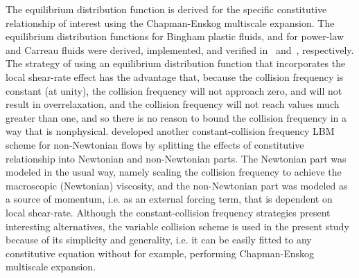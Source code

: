 \documentclass[pdftex,ms]{pittetd}
\begin{document}
The equilibrium distribution function is derived for the specific constitutive relationship of interest using the Chapman-Enskog multiscale expansion.
The equilibrium distribution functions for Bingham plastic fluids, and for power-law and Carreau fluids were derived, implemented, and verified in~\cite{wang2008lattice} and~\cite{yoshino2007numerical}, respectively.
The strategy of using an equilibrium distribution function that incorporates the local shear-rate effect has the advantage that, because the collision frequency is constant (at unity), the collision frequency will not approach zero, and will not result in overrelaxation, and the collision frequency will not reach values much greater than one, and so there is no reason to bound the collision frequency in a way that is nonphysical.
\citet{wang2011lattice} developed another constant-collision frequency LBM scheme for non-Newtonian flows by splitting the effects of constitutive relationship into Newtonian and non-Newtonian parts.
The Newtonian part was modeled in the usual way, namely scaling the collision frequency to achieve the macroscopic (Newtonian) viscosity, and the non-Newtonian part was modeled as a source of momentum, i.e. as an external forcing term, that is dependent on local shear-rate.
Although the constant-collision frequency strategies present interesting alternatives, the variable collision scheme is used in the present study because of its simplicity and generality, i.e. it can be easily fitted to any constitutive equation without for example, performing Chapman-Enskog multiscale expansion.
\end{document}
